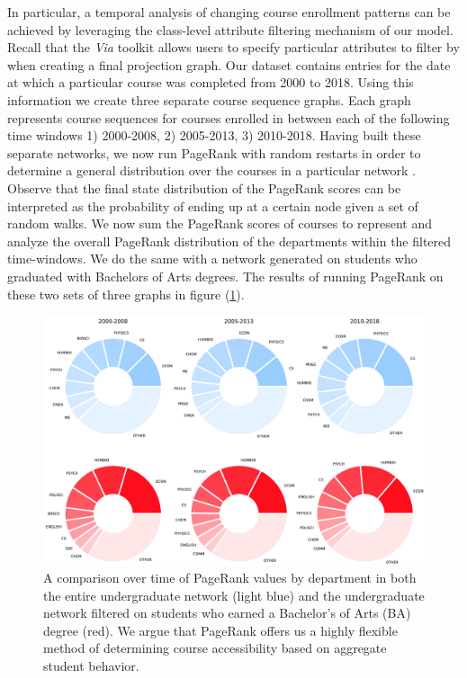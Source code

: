 \documentclass{sigchi}
\begin{document}
In particular, a temporal analysis of changing course enrollment patterns can be achieved by leveraging the class-level attribute filtering mechanism of our model. Recall that the \textit{Via} toolkit allows users to specify particular attributes to filter by when creating a final projection graph. Our dataset contains entries for the date at which a particular course was completed from 2000 to 2018. Using this information we create three separate course sequence graphs. Each graph represents course sequences for courses enrolled in between each of the following time windows 1) 2000-2008, 2) 2005-2013, 3) 2010-2018. Having built these separate networks, we now run PageRank with random restarts in order to determine a general distribution over the courses in a particular network \cite{Page1999}. Observe that the final state distribution of the PageRank scores can be interpreted as the probability of ending up at a certain node given a set of random walks. We now sum the PageRank scores of courses to represent and analyze the overall PageRank distribution of the departments within the filtered time-windows. We do the same with a network generated on students who graduated with Bachelors of Arts degrees. The results of running PageRank on these two sets of three graphs in figure (\ref{fig:evolution}).

\begin{figure}
    \centering
    \includegraphics[width=\columnwidth]{final-evolution.pdf}
    \caption{A comparison over time of PageRank values by department in both the entire undergraduate network (light blue) and the undergraduate network filtered on students who earned a Bachelor's of Arts (BA) degree (red). We argue that PageRank offers us a highly flexible method of determining course accessibility based on aggregate student behavior.}
    \label{fig:evolution}
\end{figure}
\end{document}
